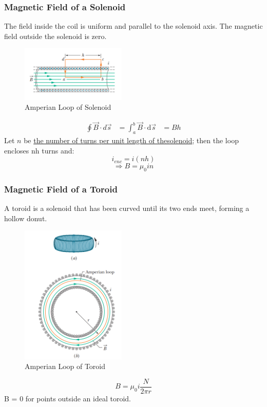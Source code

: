 \documentclass[11pt, a4paper]{article}
\begin{document}
\subsubsection{Magnetic Field of a Solenoid}
The field inside the coil is uniform and parallel
to the solenoid axis. The magnetic field outside the
solenoid is zero.
\begin{figure}[htbp]
    \centering
    \includegraphics[width = 5cm]{Solenoid.png}
    \caption{Amperian Loop of Solenoid}
\end{figure}

$$\begin{aligned}
    \oint\vec{B}\cdot d\vec{s} &= \int_{a}^b \vec{B} \cdot \mathrm{d}\vec{s} &= Bh
\end{aligned}$$
Let $n$ be \underline{the number of turns per unit length of thesolenoid}; 
then the loop encloses nh turns and:
$$i_{enc}= i(nh)$$
$$\Rightarrow B = \mu_0 in$$
\subsubsection{Magnetic Field of a Toroid}
A toroid is a solenoid that has been curved until its two
ends meet, forming a hollow donut.
\begin{figure}[htbp]
    \centering
    \includegraphics[width = 5cm]{Toroid.png}
    \caption{Amperian Loop of Toroid}
\end{figure}
$$B = \mu_0 i\frac{N}{2\pi r}$$
B = 0 for points outside an ideal toroid.
\end{document}
